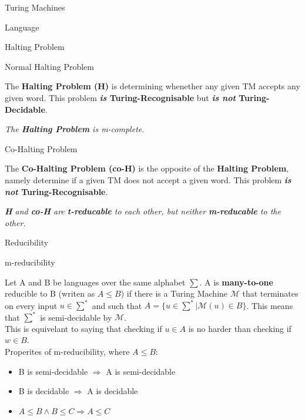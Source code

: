 \documentclass[12pt, letterpaper]{article}
\begin{document}
\begin{section}{Turing Machines}
\begin{subsection}{Language}
  \end{subsection}

  \begin{subsection}{Halting Problem}

    \begin{subsubsection}{Normal Halting Problem}

      The \textbf{Halting Problem (H)} is determining whenether any given TM
      accepts any given word. This problem \textbf{\emph{is} Turing-Recognisable}
      but \textbf{\emph{is not} Turing-Decidable}.

      \emph{The \textbf{Halting Problem} is m-complete}.

    \end{subsubsection}

    \begin{subsubsection}{Co-Halting Problem}

      The \textbf{Co-Halting Problem (co-H)} is the opposite of the \textbf{Halting Problem},
      namely determine if a given TM does not accept a given word. This problem
      \textbf{\emph{is not} Turing-Recognisable}.

    \end{subsubsection}

    \emph{\textbf{H} and \textbf{co-H} are \textbf{t-reducable} to each other, but
      neither \textbf{m-reducable} to the other.}

  \end{subsection}

  \begin{subsection}{Reducibility}

    \begin{subsubsection}{m-reducibility}

      Let A and B be languages over the same alphabet \(\sum\).
      A is \textbf{many-to-one} reducible to B (writen as \(A \leq B\)) if
      there is a Turing Machine \(\mathscr{M}\) that terminates on every input
      \(u \in \sum^{*}\) and such that \(A=\{{} u \in \sum^{*} | \mathscr{M}(u) \in B\}\).
      This means that \(\sum^{*}\) is semi-decidable by \(\mathscr{M}\). \\
      This is equivelant to saying that checking if \(u \in A\) is no harder
      than checking if \(w \in B\). \\
      Properites of m-reducibility, where \(A \leq B\):
      \begin{itemize}
        \item B is semi-decidable \(\Rightarrow\) A is semi-decidable
        \item B is decidable \(\Rightarrow\) A is decidable
        \item \(A \leq B \land B \leq C \Rightarrow A \leq C\)
      \end{itemize}


\end{subsubsection}
\end{subsection}
\end{section}
\end{document}
